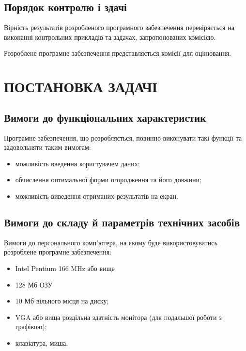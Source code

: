 \documentclass[simple,14pt,utf8,ukrainian]{eskdtext}
\begin{document}
  \subsection*{Порядок контролю і здачі}
    Вірність результатів розробленого програмного забезпечення перевіряється
    на виконанні контрольних прикладів та задачах, запропонованих комісією.

    Розроблене програмне забезпечення представляється комісії для оцінювання.
\newpage
\section{ПОСТАНОВКА ЗАДАЧІ}
    \subsection*{Вимоги до функціональних характеристик}
        Програмне забезпечення, що розробляється, повинно виконувати такі
        функції та задовольняти таким вимогам:
        \begin{itemize}
            \item можливість введення користувачем даних;
            \item обчислення оптимальної форми огородження та його довжини;
            \item можливість виведення отриманих результатів на екран.
        \end{itemize}

    \subsection*{Вимоги до складу й параметрів технічних засобів}
        Вимоги до персонального комп’ютера, на якому буде використовуватись
        розроблене програмне забезпечення:
        \begin{itemize}
            \item Intel Pentium 166 MHz або вище
            \item 128 Мб ОЗУ
            \item 10 Мб вільного місця на диску;
            \item VGA або вища роздільна здатність монітора (для подальшої
                роботи з графікою);
            \item клавіатура, миша.
        \end{itemize}
\end{document}
